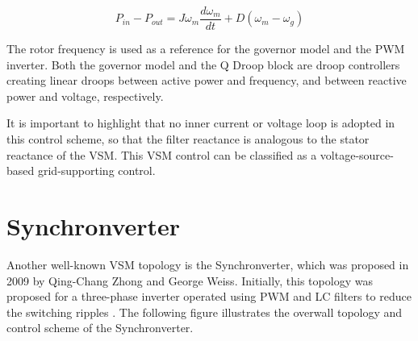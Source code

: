 \begin{equation*}
    P_{in} - P_{out} = J\omega_m \frac{d\omega_m}{dt} + D(\omega_m - \omega_g)
\end{equation*}

The rotor frequency is used as a reference for the governor model and the PWM
inverter. Both the governor model and the Q Droop block are droop controllers
creating linear droops between active power and frequency, and between reactive
power and voltage, respectively.

It is important to highlight that no inner current or voltage loop is adopted in
this control scheme, so that the filter reactance is analogous to the stator
reactance of the VSM. This VSM control can be classified as a
voltage-source-based grid-supporting control.

\section{Synchronverter}\label{sec:synchronverter}

Another well-known VSM topology is the Synchronverter, which was proposed in
2009 by Qing-Chang Zhong and George Weiss. Initially, this topology was proposed
for a three-phase inverter operated using PWM and LC filters to reduce the
switching ripples \cite{zhong2011synchronverter}. The following figure
illustrates the overwall topology and control scheme of the Synchronverter.

